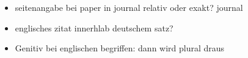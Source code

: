 \documentclass[a4paper, emulatestandardclasses, 12pt]{scrartcl}
\begin{document}
\begin{onehalfspace}
 

\noindent 


\begin{itemize}
  \item seitenangabe bei paper in journal relativ oder exakt? journal
  \item englisches zitat innerhlab deutschem satz?
  \item Genitiv bei englischen begriffen: dann wird plural draus
\end{itemize}


\vspace{3mm}




\end{onehalfspace}
\nocite{*}

\end{document}
